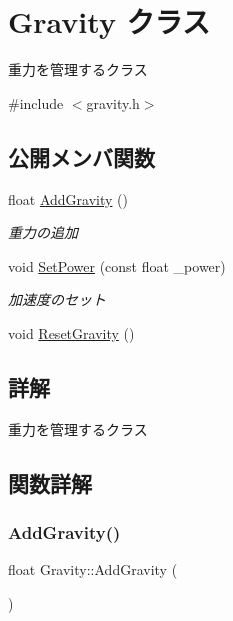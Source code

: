\hypertarget{class_gravity}{}\section{Gravity クラス}
\label{class_gravity}


重力を管理するクラス  




{\ttfamily \#include $<$gravity.\+h$>$}

\subsection*{公開メンバ関数}
\begin{DoxyCompactItemize}
\item 
float \mbox{\hyperlink{class_gravity_a4af84c9743d47601d92c83534af7b55f}{Add\+Gravity}} ()
\begin{DoxyCompactList}\small\item\em 重力の追加 \end{DoxyCompactList}\item 
void \mbox{\hyperlink{class_gravity_a5cc5e47fc7c323ea38a2a289bdefae51}{Set\+Power}} (const float \+\_\+power)
\begin{DoxyCompactList}\small\item\em 加速度のセット \end{DoxyCompactList}\item 
void \mbox{\hyperlink{class_gravity_aa334a7ebbbd79ca28e7d29c3fc5c03ed}{Reset\+Gravity}} ()
\end{DoxyCompactItemize}


\subsection{詳解}
重力を管理するクラス 

\subsection{関数詳解}
\mbox{\label{class_gravity_a4af84c9743d47601d92c83534af7b55f}} 
\subsubsection{\texorpdfstring{Add\+Gravity()}{AddGravity()}}
{\footnotesize\ttfamily float Gravity\+::\+Add\+Gravity (\begin{DoxyParamCaption}{ }\end{DoxyParamCaption})}




